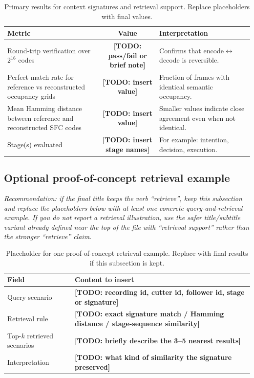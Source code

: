 \documentclass[12pt,a4paper,twoside,openright]{report}
\newcommand{\TODO}[1]{\textbf{[TODO: #1]}}
\begin{document}
    \begin{table}[H]
        \centering
        \caption{Primary results for context signatures and retrieval support. Replace placeholders with final values.}
        \label{tab:rq3-signatures}
        {\small
        \setlength{\tabcolsep}{4pt}
            \begin{tabularx}{\textwidth}{@{}l c X@{}}
\toprule
Metric & Value & Interpretation \\
\midrule
Round-trip verification over $2^{16}$ codes & \TODO{pass/fail or brief note} & Confirms that encode$\leftrightarrow$decode is reversible. \\
Perfect-match rate for reference vs reconstructed occupancy grids & \TODO{insert value} & Fraction of frames with identical semantic occupancy. \\
Mean Hamming distance between reference and reconstructed SFC codes & \TODO{insert value} & Smaller values indicate close agreement even when not identical. \\
Stage(s) evaluated & \TODO{insert stage names} & For example: intention, decision, execution. \\
\bottomrule
            \end{tabularx}}
    \end{table}

    \subsection{Optional proof-of-concept retrieval example}
    \noindent\emph{Recommendation: if the final title keeps the verb ``retrieve'', keep this subsection and replace the placeholders below with at least one concrete query-and-retrieval example. If you do not report a retrieval illustration, use the safer title/subtitle variant already defined near the top of the file with ``retrieval support'' rather than the stronger ``retrieve'' claim.}

    \begin{table}[H]
        \centering
        \caption{Placeholder for one proof-of-concept retrieval example. Replace with final results if this subsection is kept.}
        \label{tab:rq3-retrieval}
        {\small
        \setlength{\tabcolsep}{4pt}
            \begin{tabularx}{\textwidth}{@{}lX@{}}
\toprule
Field & Content to insert \\
\midrule
Query scenario & \TODO{recording id, cutter id, follower id, stage or signature} \\
Retrieval rule & \TODO{exact signature match / Hamming distance / stage-sequence similarity} \\
Top-$k$ retrieved scenarios & \TODO{briefly describe the 3--5 nearest results} \\
Interpretation & \TODO{what kind of similarity the signature preserved} \\
\bottomrule
            \end{tabularx}}
    \end{table}
\end{document}
